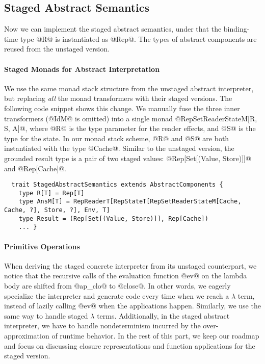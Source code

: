 \subsection{Staged Abstract Semantics}

Now we can implement the staged abstract semantics, under that the binding-time
type @R@ is instantiated as @Rep@. The types of abstract components are reused
from the unstaged version.

\paragraph{Staged Monads for Abstract Interpretation}
We use the same monad stack structure from the unstaged abstract interpreter,
but replacing \textit{all} the monad transformers with their staged versions. The
following code snippet shows this change.
We manually fuse the three inner transformers (@IdM@ is omitted) into a single
monad @RepSetReaderStateM[R, S, A]@, where @R@ is the type parameter for the
reader effects, and @S@ is the type for the state.  In our monad stack scheme,
@R@ and @S@ are both instantiated with the type @Cache@. Similar to the unstaged
version, the grounded result type is a pair of two staged values:
@Rep[Set[(Value, Store)]]@ and @Rep[Cache]@.
\begin{lstlisting}
  trait StagedAbstractSemantics extends AbstractComponents {
    type R[T] = Rep[T]
    type AnsM[T] = RepReaderT[RepStateT[RepSetReaderStateM[Cache, Cache, ?], Store, ?], Env, T]
    type Result = (Rep[Set[(Value, Store)]], Rep[Cache])
    ... }
\end{lstlisting}

\paragraph{Primitive Operations} 
When deriving the staged concrete interpreter from its unstaged counterpart, we
notice that the recursive calls of the evaluation function @ev@ on the lambda
body are shifted from @ap_clo@ to @close@. In other words, we eagerly
specialize the interpreter and generate code every time when we reach a
$\lambda$ term, instead of lazily calling @ev@ when the applications happen.
Similarly, we use the same way to handle staged $\lambda$ terms.  Additionally,
in the staged abstract interpreter, we have to handle nondeterminism incurred
by the over-approximation of runtime behavior.  In the rest of this part, we
keep our roadmap and focus on discussing closure representations and function
applications for the staged version.

